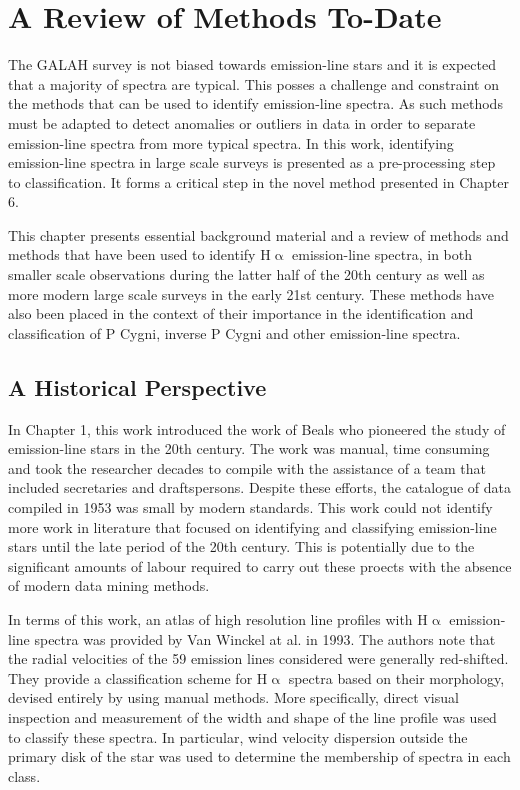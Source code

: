 \chapter{A Review of Methods To-Date}

The GALAH survey is not biased towards emission-line stars and it is expected that a majority of spectra are typical. This posses a challenge and constraint on the methods that can be used to identify emission-line spectra. As such methods must be adapted to detect anomalies or outliers in data in order to separate emission-line spectra from more typical spectra. In this work, identifying emission-line spectra in large scale surveys is presented as a pre-processing step to classification. It forms a critical step in the novel method presented in Chapter 6. 

This chapter presents essential background material and a review of methods and methods that have been used to identify H$\upalpha$ emission-line spectra, in both smaller scale observations during the latter half of the 20th century as well as more modern large scale surveys in the early 21st century. These methods have also been placed in the context of their importance in the identification and classification of P Cygni, inverse P Cygni and other emission-line spectra.

\section{A Historical Perspective}
In Chapter 1, this work introduced the work of Beals who pioneered the study of emission-line stars in the 20th century. The work was manual, time consuming and took the researcher decades to compile\cite{1953PDAO....9....1B} with the assistance of a team that included secretaries and draftspersons. Despite these efforts, the catalogue of data compiled in 1953 was small by modern standards. This work could not identify more work in literature that focused on identifying and classifying emission-line stars until the late period of the 20th century. This is potentially due to the significant amounts of labour required to carry out these proects with the absence of modern data mining methods. 

In terms of this work, an atlas of high resolution line profiles with H$\upalpha$ emission-line spectra was provided by Van Winckel at al. in 1993\cite{van1993atlas}. The authors note that the radial velocities of the 59 emission lines considered were generally red-shifted. They provide a classification scheme for H$\upalpha$ spectra based on their morphology, devised entirely by using manual methods. More specifically, direct visual inspection and measurement of the width and shape of the line profile was used to classify these spectra. In particular, wind velocity dispersion outside the primary disk of the star was used to determine the membership of spectra in each class.

